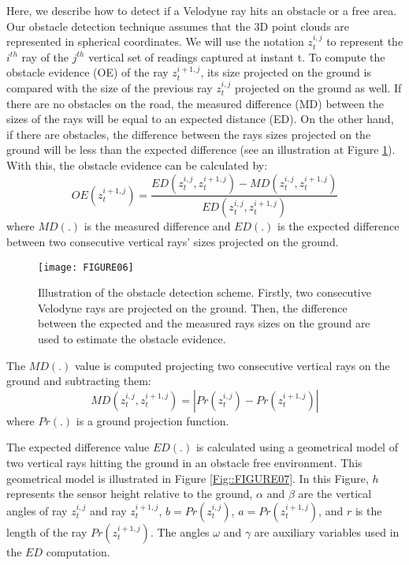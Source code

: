 Here, we describe how to detect if a Velodyne ray hits an obstacle or a free area. Our obstacle detection technique assumes that the 3D point clouds are represented in spherical coordinates. We will use the notation $z_t^{i,j}$ to represent the $i^{th}$ ray of the $j^{th}$ vertical set of readings captured at instant t. To compute the obstacle evidence (OE) of the ray $z_t^{i+1,j}$, its size projected on the ground is compared with the size of the previous ray $z_t^{i,j}$ projected on the ground as well. If there are no obstacles on the road, the measured difference (MD) between the sizes of the rays will be equal to an expected distance (ED). On the other hand, if there are obstacles, the difference between the rays sizes projected on the ground will be less than the expected difference (see an illustration at Figure \ref{Fig::FIGURE06}).  With this, the obstacle evidence can be calculated by:
\begin{equation}
\label{Eq::ObstacleEvidence}
OE\left( z_t^{i+1,j}\right) =\frac{ED \left( z_t^{i,j},z_t^{i+1,j}\right) -MD\left( z_t^{i,j},z_t^{i+1,j}\right) }{ED\left( z_t^{i,j},z_t^{i+1,j}\right) }
\end{equation}
where $MD(.)$ is the measured difference and $ED(.)$ is the expected difference between two consecutive vertical rays' sizes projected on the ground.

\begin{figure}[ht]
	\centering
	\texttt{[image: FIGURE06]}
	\caption{Illustration of the obstacle detection scheme. Firstly, two consecutive Velodyne rays are projected on the ground. Then, the difference between the expected and the measured rays sizes on the ground are used to estimate the obstacle evidence.}
	\label{Fig::FIGURE06}
\end{figure}

The $MD(.)$ value is computed projecting two consecutive vertical rays on the ground and subtracting them:
\begin{equation}
\label{Eq::MeasuredDifference}
MD\left( z_t^{i,j},z_t^{i+1,j}\right) =\left| Pr\left( z_t^{i,j}\right) -Pr\left( z_t^{i+1,j}\right) \right|
\end{equation}
where  $Pr(.)$ is a ground projection function.

The expected difference value $ED(.)$ is calculated using a geometrical model of two vertical rays hitting the ground in an obstacle free environment. This geometrical model is illustrated in Figure \ref{Fig::FIGURE07}. In this Figure, $h$ represents the sensor height relative to the ground, $\alpha$ and $\beta$ are the vertical angles of ray $z_t^{i,j}$ and ray $z_t^{i+1,j}$, $b=Pr\left( z_t^{i,j}\right) $, $a=Pr\left( z_t^{i+1,j}\right) $, and $r$ is the length of the ray $Pr\left( z_t^{i+1,j}\right) $. The angles $\omega$ and $\gamma$ are auxiliary variables used in the $ED$ computation.

